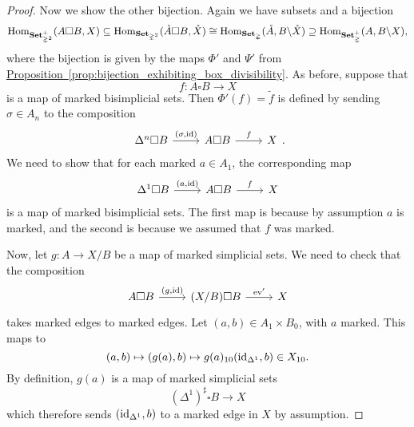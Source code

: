 \documentclass[main.tex]{subfiles}
\begin{document}
\begin{proof}
  Now we show the other bijection. Again we have subsets and a bijection
  \begin{equation*}
    \mathrm{Hom}_{\mathbf{Set}_{\mathbb{\Delta}^{2}}^{+}}(A \square B, X) \subseteq \mathrm{Hom}_{\mathbf{Set}_{\mathbb{\Delta}^{2}}}(\mathring{A} \square B, \mathring{X}) \cong \mathrm{Hom}_{\mathbf{Set}_{\mathbb{\Delta}}}(\mathring{A}, B \backslash \mathring{X}) \supseteq \mathrm{Hom}_{\mathbf{Set}_{\mathbb{\Delta}}^{+}}(A, B \backslash X),
  \end{equation*}
  where the bijection is given by the maps $\Phi'$ and $\Psi'$ from \hyperref[prop:bijection_exhibiting_box_divisibility]{Proposition~\ref*{prop:bijection_exhibiting_box_divisibility}}. As before, suppose that
  \begin{equation*}
    f\colon A \square B \to X
  \end{equation*}
  is a map of marked bisimplicial sets. Then $\Phi'(f) = \tilde{f}$ is defined by sending $\sigma \in A_{n}$ to the composition
  \begin{equation*}
    \begin{tikzcd}
      \Delta^{n} \square B
      \arrow[r, "{(\sigma, \id)}"]
      & A \square B
      \arrow[r, "f"]
      & X
    \end{tikzcd}.
  \end{equation*}
  We need to show that for each marked $a \in A_{1}$, the corresponding map
  \begin{equation*}
    \begin{tikzcd}
      \Delta^{1} \square B
      \arrow[r, "{(a, \id)}"]
      & A \square B
      \arrow[r, "f"]
      & X
    \end{tikzcd}
  \end{equation*}
  is a map of marked bisimplicial sets. The first map is because by assumption $a$ is marked, and the second is because we assumed that $f$ was marked.

  Now, let $g\colon A \to X / B$ be a map of marked simplicial sets. We need to check that the composition
  \begin{equation*}
    \begin{tikzcd}
      A \square B
      \arrow[r, "{(g, \id)}"]
      & (X / B) \square B
      \arrow[r, "\ev'"]
      & X
    \end{tikzcd}
  \end{equation*}
  takes marked edges to marked edges. Let $(a, b) \in A_{1} \times B_{0}$, with $a$ marked. This maps to
  \begin{equation*}
    (a, b) \mapsto (g(a), b) \mapsto g(a)_{10}(\mathrm{id}_{\Delta^{1}}, b) \in X_{10}.
  \end{equation*}
  By definition, $g(a)$ is a map of marked simplicial sets
  \begin{equation*}
    (\Delta^{1})^{\sharp} \square B \to X
  \end{equation*}
  which therefore sends $(\mathrm{id}_{\Delta^{1}}, b)$ to a marked edge in $X$ by assumption.
\end{proof}
\end{document}
